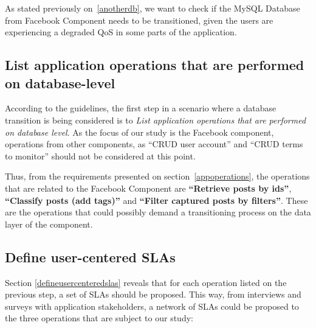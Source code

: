 As stated previously on~\ref{anotherdb}, we want to check if the MySQL Database from Facebook Component needs to be transitioned, given the users are experiencing a degraded QoS in some parts of the application. 

\clearpage
\subsection{List application operations that are performed on database-level}
According to the guidelines, the first step in a scenario where a database transition is being considered is to \textit{List application operations that are performed on database level}. As the focus of our study is the Facebook component, operations from other components, as ``CRUD user account'' and ``CRUD terms to monitor'' should not be considered at this point. 

Thus, from the requirements presented on section~\ref{appoperations}, the operations that are related to the Facebook Component are \textbf{``Retrieve posts by ids''}, \textbf{``Classify posts (add tags)''} and \textbf{``Filter captured posts by filters''}. These are the operations that could possibly demand a transitioning process on the data layer of the component.  

\clearpage
\subsection{Define user-centered SLAs}

Section \ref{defineusercenteredslas} reveals that for each operation listed on the previous step, a set of SLAs should be proposed. This way, from interviews and surveys with application stakeholders, a network of SLAs could be proposed to the three operations that are subject to our study: 

